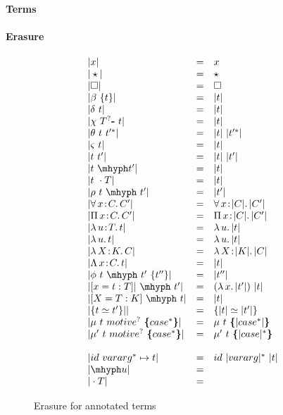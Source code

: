 \documentclass{article}
\newcommand{\abs}[4]{{#1}\, #2\! : \! #3.\, #4}
\newcommand{\absu}[3]{{#1}\, #2.\, #3}
\begin{document}
\paragraph{Terms}

\paragraph{Erasure}
\begin{figure}[h]
  \[
  \begin{array}{lll}
    |x| & = & x \\
    |\star| & = & \star \\
    |\Box| & = & \Box \\
    |\beta\ \{t\}| & = & |t|\\
    |\delta\ t| & = & |t|\\
    |\chi\ T^? \textbf{-}\ t| & = & |t| \\
    |\theta\ t\ t'^*| & = & |t|\ |t'^*| \\
    |\varsigma\ t| & = & |t| \\
    |t\ t'| & = & |t|\ |t'| \\ 
    |t\ \mhyph t'| & = & |t| \\
    |t\ \cdot T| & = & |t| \\
    |\rho\ t\ \mhyph\ t'| & = & |t'| \\
    |\abs{\forall}{x}{C}{C'}| & = & \abs{\forall}{x}{|C|}{|C'|}\\
    |\abs{\Pi}{x}{C}{C'}| & = & \abs{\Pi}{x}{|C|}{|C'|}\\
    |\abs{\lambda}{u}{T}{t}| & = &  \absu{\lambda}{u}{|t|} \\
    |\absu{\lambda}{u}{t}| & = &  \absu{\lambda}{u}{|t|} \\
    |\abs{\lambda}{X}{K}{C}| & = &  \abs{\lambda}{X}{|K|}{|C|} \\
    |\abs{\Lambda}{x}{C}{t}| & = &  |t| \\ 
    |\phi\ t\ \mhyph\ t'\ \{t''\}| & = & |t''| \\
    |[ x = t : T]|\ \mhyph\ t' | & = & (\absu{\lambda}{x}{|t'|})\ |t|\\
    |[X = T : K]\ \mhyph\ t | & = & |t| \\
    |\{ t \simeq t' \}|| & = & \{ |t| \simeq |t'| \}
    \\ |\mu\ t\ motive^?\ \textbf{\{} case^* \textbf{\}}| & = & \mu\ t\
       \textbf{\{} |case^*| \textbf{\}}
    \\ |\mu'\ t\ motive^?\ \textbf{\{} case^* \textbf{\}}| & = & \mu'\ t\
       \textbf{\{} |case|^* \textbf{\}}
    \\ \\
    |id\ vararg^* \mapsto t| & = & id\ |vararg|^*\ |t|
    \\ |\mhyph u| & = & 
    \\ |\cdot T|  & = &
  \end{array}
  \]
  \caption{Erasure for annotated terms}
  \label{fig:eraser}
\end{figure}
\end{document}
